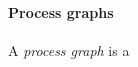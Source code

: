 \documentclass{myproc}
\begin{document}
\small
\pagestyle{empty}


\paragraph{Process graphs}
A {\em process graph\/} is a 
\end{document}
